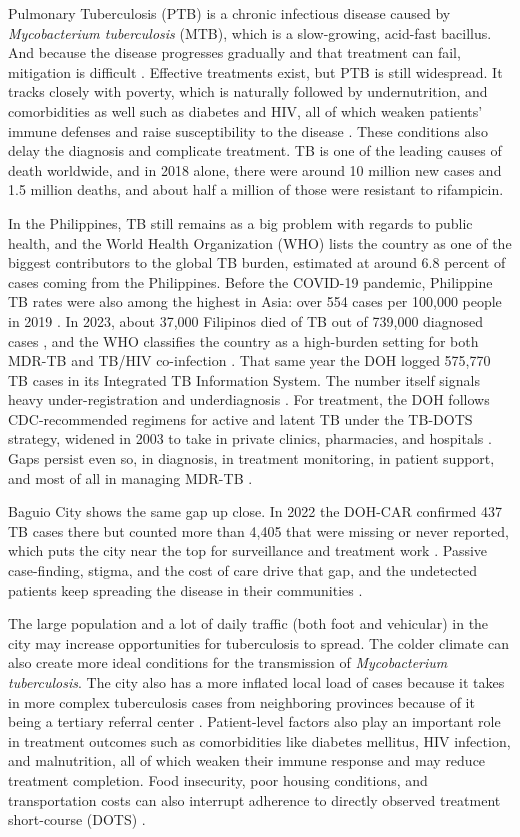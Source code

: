 \documentclass[12pt]{article}
\renewcommand{\_}{\textunderscore\allowbreak}
\begin{document}
Pulmonary Tuberculosis (PTB) is a chronic infectious disease caused by \textit{Mycobacterium tuberculosis} (MTB), which is a slow-growing, acid-fast bacillus. And because the disease progresses gradually and that treatment can fail, mitigation is difficult \citep{ref20}. Effective treatments exist, but PTB is still widespread. It tracks closely with poverty, which is naturally followed by undernutrition, and comorbidities as well such as diabetes and HIV, all of which weaken patients' immune defenses and raise susceptibility to the disease \citep{ref20}. These conditions also delay the diagnosis and complicate treatment. TB is one of the leading causes of death worldwide, and in 2018 alone, there were around 10 million new cases and 1.5 million deaths, and about half a million of those were resistant to rifampicin.

In the Philippines, TB still remains as a big problem with regards to public health, and the World Health Organization (WHO) lists the country as one of the biggest contributors to the global TB burden, estimated at around 6.8 percent of cases coming from the Philippines. Before the COVID-19 pandemic, Philippine TB rates were also among the highest in Asia: over 554 cases per 100,000 people in 2019 \citep{ref8}. In 2023, about 37,000 Filipinos died of TB out of 739,000 diagnosed cases \citep{who2023tb}, and the WHO classifies the country as a high-burden setting for both MDR-TB and TB/HIV co-infection \citep{ref18}. That same year the DOH logged 575,770 TB cases in its Integrated TB Information System. The number itself signals heavy under-registration and underdiagnosis \citep{ref4}. For treatment, the DOH follows CDC-recommended regimens for active and latent TB under the TB-DOTS strategy, widened in 2003 to take in private clinics, pharmacies, and hospitals \citep{ref5, ref6}. Gaps persist even so, in diagnosis, in treatment monitoring, in patient support, and most of all in managing MDR-TB \citep{ref29}.

Baguio City shows the same gap up close. In 2022 the DOH-CAR confirmed 437 TB cases there but counted more than 4,405 that were missing or never reported, which puts the city near the top for surveillance and treatment work \citep{ref25}. Passive case-finding, stigma, and the cost of care drive that gap, and the undetected patients keep spreading the disease in their communities \citep{ref26}.

The large population and a lot of daily traffic (both foot and vehicular) in the city may increase opportunities for tuberculosis to spread. The colder climate can also create more ideal conditions for the transmission of \textit{Mycobacterium tuberculosis}. The city also has a more inflated local load of cases because it takes in more complex tuberculosis cases from neighboring provinces because of it being a tertiary referral center \citep{ref30}. Patient-level factors also play an important role in treatment outcomes such as comorbidities like diabetes mellitus, HIV infection, and malnutrition, all of which weaken their immune response and may reduce treatment completion. Food insecurity, poor housing conditions, and transportation costs can also interrupt adherence to directly observed treatment short-course (DOTS) \citep{ref30,ref32,ref33,ref34}.
\end{document}
